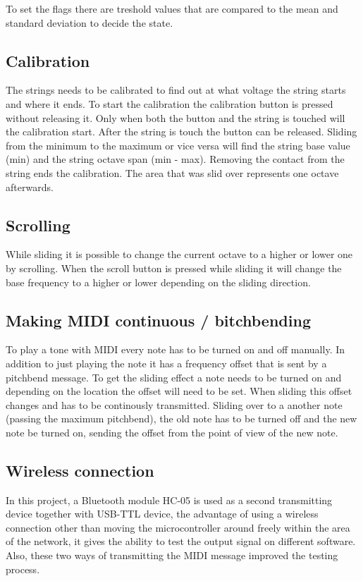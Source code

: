 \documentclass{article}
\begin{document}
To set the flags there are treshold values that are compared to the mean and standard deviation to decide the state.

\subsection{Calibration}
The strings needs to be calibrated to find out at what voltage the string starts and where it ends. To start the calibration the calibration button is pressed without releasing it. Only when both the button and the string is touched will the calibration start. After the string is touch the button can be released. Sliding from the minimum to the maximum or vice versa will find the string base value (min) and the string octave span (min - max). Removing the contact from the string ends the calibration. The area that was slid over represents one octave afterwards.

\subsection{Scrolling}
While sliding it is possible to change the current octave to a higher or lower one by scrolling. When the scroll button is pressed while sliding it will change the base frequency to a higher or lower depending on the sliding direction.

\subsection{Making MIDI continuous / bitchbending}
To play a tone with MIDI every note has to be turned on and off manually. In addition to just playing the note it has a frequency offset that is sent by a pitchbend message. To get the sliding effect a note needs to be turned on and depending on the location the offset will need to be set. When sliding this offset changes and has to be continously transmitted. Sliding over to a another note (passing the maximum pitchbend), the old note has to be turned off and the new note be turned on, sending the offset from the point of view of the new note.

\subsection{Wireless connection}
In this project, a Bluetooth module HC-05 is used as a second transmitting device together with USB-TTL device, the advantage of using a wireless connection other than moving the microcontroller around freely within the area of the network, it gives the ability to test the output signal on different software. Also, these two ways of transmitting the MIDI message improved the testing process. 
\end{document}
